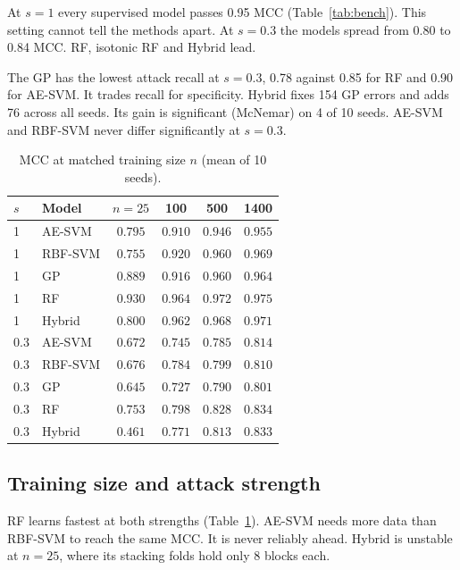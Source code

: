 \documentclass[conference,10pt]{IEEEtran}
\begin{document}
At $s=1$ every supervised model passes 0.95 MCC (Table~\ref{tab:bench}). This
setting cannot tell the methods apart. At $s=0.3$ the models spread from 0.80 to
0.84 MCC. RF, isotonic RF and Hybrid lead.

The GP has the lowest attack recall at $s=0.3$, 0.78 against 0.85 for RF and
0.90 for AE-SVM. It trades recall for specificity. Hybrid fixes 154 GP errors
and adds 76 across all seeds. Its gain is significant (McNemar) on 4 of 10
seeds. AE-SVM and RBF-SVM never differ significantly at $s=0.3$.

\begin{table}[t]
  \centering
  \caption{MCC at matched training size $n$ (mean of 10 seeds).}
  \label{tab:matched}
  \footnotesize
  \setlength{\tabcolsep}{4pt}
  \begin{tabular}{llcccc}
    \toprule
    $s$ & Model & $n=25$ & 100 & 500 & 1400 \\
    \midrule
    1 & AE-SVM & $0.795$ & $0.910$ & $0.946$ & $0.955$ \\
    1 & RBF-SVM & $0.755$ & $0.920$ & $0.960$ & $0.969$ \\
    1 & GP & $0.889$ & $0.916$ & $0.960$ & $0.964$ \\
    1 & RF & $0.930$ & $0.964$ & $0.972$ & $0.975$ \\
    1 & Hybrid & $0.800$ & $0.962$ & $0.968$ & $0.971$ \\
    \midrule
    0.3 & AE-SVM & $0.672$ & $0.745$ & $0.785$ & $0.814$ \\
    0.3 & RBF-SVM & $0.676$ & $0.784$ & $0.799$ & $0.810$ \\
    0.3 & GP & $0.645$ & $0.727$ & $0.790$ & $0.801$ \\
    0.3 & RF & $0.753$ & $0.798$ & $0.828$ & $0.834$ \\
    0.3 & Hybrid & $0.461$ & $0.771$ & $0.813$ & $0.833$ \\
    \bottomrule
  \end{tabular}
\end{table}

\subsection{Training size and attack strength}

RF learns fastest at both strengths (Table~\ref{tab:matched}). AE-SVM needs more
data than RBF-SVM to reach the same MCC. It is never reliably ahead. Hybrid is
unstable at $n=25$, where its stacking folds hold only 8 blocks each.
\end{document}
